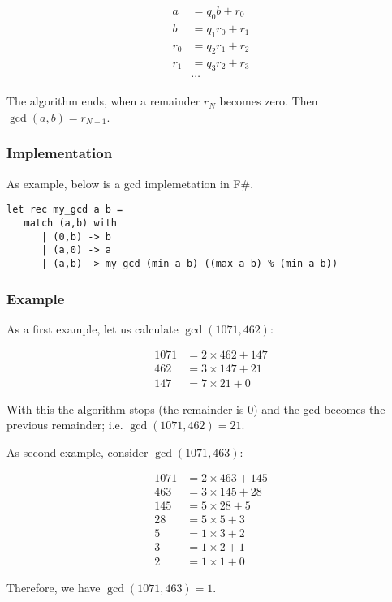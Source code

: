 \begin{align*}
  a &= q_0 b + r_0 \\
  b &= q_1 r_0 + r_1 \\
  r_0 &= q_2 r_1 + r_2 \\
  r_1 &= q_3 r_2 + r_3 \\
  &\cdots  
\end{align*}

The algorithm ends, when a remainder $r_N$ becomes zero. Then $\gcd(a,b) = r_{N-1}$.

\subsubsection{Implementation}

As example, below is a gcd implemetation in F\#.

\begin{verbatim}
let rec my_gcd a b = 
   match (a,b) with
      | (0,b) -> b
      | (a,0) -> a
      | (a,b) -> my_gcd (min a b) ((max a b) % (min a b))
\end{verbatim}


\subsubsection{Example}

As a first example, let us calculate $\gcd(1071, 462)$:

\begin{align*}
  1071 &= 2 \times 462 + 147 \\
  462 &= 3 \times 147 + 21 \\
  147 &= 7 \times 21 + 0
\end{align*}

With this the algorithm stops (the remainder is $0$) and the gcd becomes the previous remainder; i.e. $\gcd(1071, 462) = 21$.

As second example, consider $\gcd(1071, 463)$:

\begin{align*}
  1071 &= 2 \times 463 + 145 \\
  463 &= 3 \times 145 + 28 \\
  145 &= 5 \times 28 + 5 \\
  28 &= 5 \times 5 + 3 \\
  5 &= 1 \times 3 + 2 \\
  3 &= 1 \times 2 + 1 \\
  2 &= 1 \times 1 + 0
\end{align*}

Therefore, we have $\gcd(1071, 463) = 1$.
